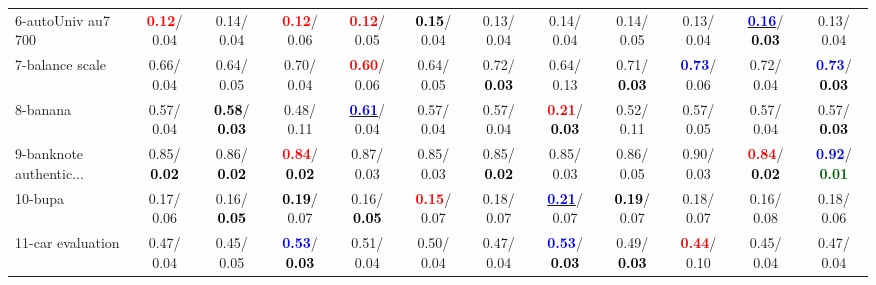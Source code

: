 \begin{table}[h]
\begin{center}
{\begin{tabular}{lc|c|c|c|c|c|c|c|c|c|c}
6-autoUniv au7 700 & \textcolor{red}{\textbf{  0.12}}/  0.04 &   0.14/  0.04 & \textcolor{red}{\textbf{  0.12}}/  0.06 & \textcolor{red}{\textbf{  0.12}}/  0.05 & \textcolor{black}{\textbf{  0.15}}/  0.04 &   0.13/  0.04 &   0.14/  0.04 &   0.14/  0.05 &   0.13/  0.04 & \underline{\textcolor{blue}{\textbf{  0.16}}}/\textcolor{black}{\textbf{  0.03}} &   0.13/  0.04 \\
7-balance scale &   0.66/  0.04 &   0.64/  0.05 &   0.70/  0.04 & \textcolor{red}{\textbf{  0.60}}/  0.06 &   0.64/  0.05 &   0.72/\textcolor{black}{\textbf{  0.03}} &   0.64/  0.13 &   0.71/\textcolor{black}{\textbf{  0.03}} & \textcolor{blue}{\textbf{  0.73}}/  0.06 &   0.72/  0.04 & \textcolor{blue}{\textbf{  0.73}}/\textcolor{black}{\textbf{  0.03}} \\ \hline
8-banana &   0.57/  0.04 & \textcolor{black}{\textbf{  0.58}}/\textcolor{black}{\textbf{  0.03}} &   0.48/  0.11 & \underline{\textcolor{blue}{\textbf{  0.61}}}/  0.04 &   0.57/  0.04 &   0.57/  0.04 & \textcolor{red}{\textbf{  0.21}}/\textcolor{black}{\textbf{  0.03}} &   0.52/  0.11 &   0.57/  0.05 &   0.57/  0.04 &   0.57/\textcolor{black}{\textbf{  0.03}} \\
9-banknote authentic... &   0.85/\textcolor{black}{\textbf{  0.02}} &   0.86/\textcolor{black}{\textbf{  0.02}} & \textcolor{red}{\textbf{  0.84}}/\textcolor{black}{\textbf{  0.02}} &   0.87/  0.03 &   0.85/  0.03 &   0.85/\textcolor{black}{\textbf{  0.02}} &   0.85/  0.03 &   0.86/  0.05 &   0.90/  0.03 & \textcolor{red}{\textbf{  0.84}}/\textcolor{black}{\textbf{  0.02}} & \textcolor{blue}{\textbf{  0.92}}/\textcolor{darkgreen}{\textbf{  0.01}} \\
10-bupa &   0.17/  0.06 &   0.16/\textcolor{black}{\textbf{  0.05}} & \textcolor{black}{\textbf{  0.19}}/  0.07 &   0.16/\textcolor{black}{\textbf{  0.05}} & \textcolor{red}{\textbf{  0.15}}/  0.07 &   0.18/  0.07 & \underline{\textcolor{blue}{\textbf{  0.21}}}/  0.07 & \textcolor{black}{\textbf{  0.19}}/  0.07 &   0.18/  0.07 &   0.16/  0.08 &   0.18/  0.06 \\
11-car evaluation &   0.47/  0.04 &   0.45/  0.05 & \textcolor{blue}{\textbf{  0.53}}/\textcolor{black}{\textbf{  0.03}} &   0.51/  0.04 &   0.50/  0.04 &   0.47/  0.04 & \textcolor{blue}{\textbf{  0.53}}/\textcolor{black}{\textbf{  0.03}} &   0.49/\textcolor{black}{\textbf{  0.03}} & \textcolor{red}{\textbf{  0.44}}/  0.10 &   0.45/  0.04 &   0.47/  0.04 \\

\end{tabular}}
\end{center}
\end{table}
